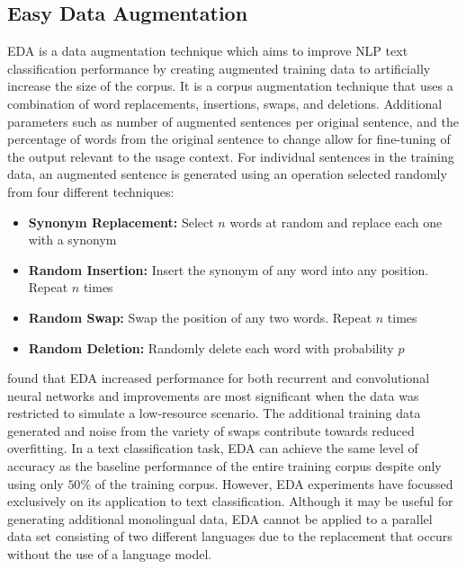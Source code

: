 \subsection{Easy Data Augmentation}
\acrfull{EDA} is a data augmentation technique which aims to improve \acrshort{NLP} text classification performance by creating augmented training data to artificially increase the size of the corpus. It is a corpus augmentation technique that uses a combination of word replacements, insertions, swaps, and deletions. Additional parameters such as number of augmented sentences per original sentence, and the percentage of words from the original sentence to change allow for fine-tuning of the output relevant to the usage context. For individual sentences in the training data, an augmented sentence is generated using an operation selected randomly from four different techniques:
\begin{itemize}
    \item \textbf{Synonym Replacement:} Select $n$ words at random and replace each one with a synonym
    \item \textbf{Random Insertion:} Insert the synonym of any word into any position. Repeat $n$ times
    \item \textbf{Random Swap:} Swap the position of any two words. Repeat $n$ times
    \item \textbf{Random Deletion:} Randomly delete each word with probability $p$
\end{itemize}

\cite{wei_eda:_2019} found that \acrshort{EDA} increased performance for both recurrent and convolutional neural networks and improvements are most significant when the data was restricted to simulate a low-resource scenario. The additional training data generated and noise from the variety of swaps contribute towards reduced overfitting. In a text classification task, \acrshort{EDA} can achieve the same level of accuracy as the baseline performance of the entire training corpus despite only using only $50$\% of the training corpus. However, \acrshort{EDA} experiments have focussed exclusively on its application to text classification. Although it may be useful for generating additional monolingual data, \acrshort{EDA} cannot be applied to a parallel data set consisting of two different languages due to the replacement that occurs without the use of a language model.



